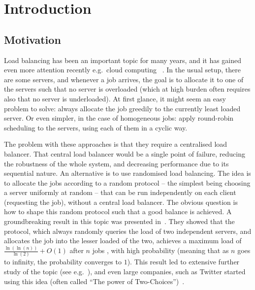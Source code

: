 \chapter{Introduction}\label{introduction}

\ifpdf
    \graphicspath{{Chapter1/Figs/Raster/}{Chapter1/Figs/PDF/}{Chapter1/Figs/}}
\else
    \graphicspath{{Chapter1/Figs/Vector/}{Chapter1/Figs/}}
\fi


\section{Motivation}

Load balancing has been an important topic for many years, and it has gained even more attention recently e.g.\ cloud computing~\cite{mishra2020cloud} . In the usual setup, there are some servers, and whenever a job arrives, the goal is to allocate it to one of the servers such that no server is overloaded (which at high burden often requires also that no server is underloaded). At first glance, it might seem an easy problem to solve: always allocate the job greedily to the currently least loaded server. Or even simpler, in the case of homogeneous jobs: apply round-robin scheduling to the servers, using each of them in a cyclic way. 

The problem with these approaches is that they require a centralised load balancer. That central load balancer would be a single point of failure, reducing the robustness of the whole system, and decreasing performance due to its sequential nature. An alternative is to use randomised load balancing. The idea is to allocate the jobs according to a random protocol -- the simplest being choosing a server uniformly at random -- that can be run independently on each client (requesting the job), without a central load balancer. The obvious question is how to shape this random protocol such that a good balance is achieved. A groundbreaking result in this topic was presented in~\cite{azar1999twochoice}. They showed that the \TwoChoice protocol, which always randomly queries the load of two independent servers, and allocates the job into the lesser loaded of the two, achieves a maximum load of $\frac{\ln(\ln(n))}{\ln(2)} + O(1)$ after $n$ jobs , with high probability (meaning that as $n$ goes to infinity, the probability converges to $1$). This result led to extensive further study of the topic (see e.g.~\cite{richa2001surveytwochoice}), and even large companies, such as Twitter started using this idea (often called ``The power of Two-Choices'')~\cite{anderson2019twitter}.


